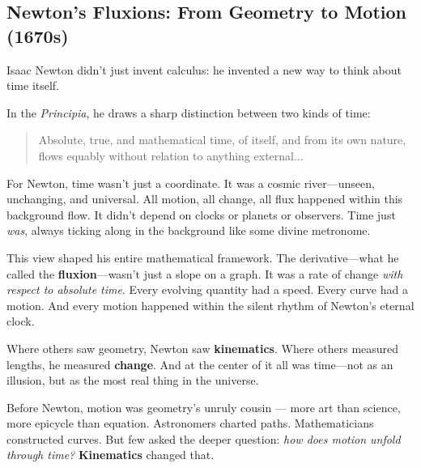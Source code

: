 \subsection{Newton’s Fluxions: From Geometry to Motion (1670s)}

  Isaac Newton didn’t just invent calculus: he invented a new way to think about time itself.
  
  In the \textit{Principia}, he draws a sharp distinction between two kinds of time:

  \begin{quote}
  Absolute, true, and mathematical time, of itself, and from its own nature, flows equably without relation to anything external...
  \end{quote}
  
  For Newton, time wasn’t just a coordinate. It was a cosmic river—unseen, unchanging, and universal. All motion, all change, all flux happened within this background flow. It didn’t depend on clocks or planets or observers. Time just \textit{was}, always ticking along in the background like some divine metronome.
  
  This view shaped his entire mathematical framework. The derivative—what he called the \textbf{fluxion}—wasn’t just a slope on a graph. It was a rate of change \textit{with respect to absolute time}. Every evolving quantity had a speed. Every curve had a motion. And every motion happened within the silent rhythm of Newton’s eternal clock.

  Where others saw geometry, Newton saw \textbf{kinematics}. Where others measured lengths, he measured \textbf{change}. And at the center of it all was time—not as an illusion, but as the most real thing in the universe.

    Before Newton, motion was geometry's unruly cousin — more art than science, more epicycle than equation. Astronomers charted paths. Mathematicians constructed curves. But few asked the deeper question: \textit{how does motion unfold through time?} \textbf{Kinematics} changed that.

